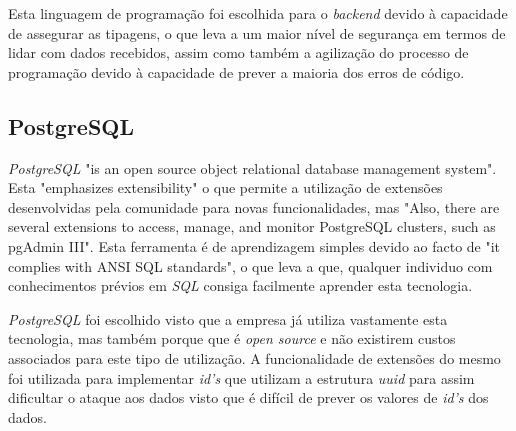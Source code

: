 Esta linguagem de programação foi escolhida para o \textit{backend} devido à capacidade de assegurar as tipagens, o que leva a um maior nível de segurança em termos de lidar com dados recebidos, assim como também a agilização do processo de programação devido à capacidade de prever a maioria dos erros de código.

\subsection{PostgreSQL}
\emph{PostgreSQL} "is an open source object relational database management system"\citep{Juba2015}. Esta "emphasizes extensibility"\citep{Juba2015} o que permite a utilização de extensões desenvolvidas pela comunidade para novas funcionalidades, mas "Also, there are several extensions to access, manage, and monitor PostgreSQL clusters, such as pgAdmin III"\citep{Juba2015}. Esta ferramenta é de aprendizagem simples devido ao facto de "it complies with ANSI SQL standards"\citep{Juba2015}, o que leva a que, qualquer individuo com conhecimentos prévios em \emph{SQL} consiga facilmente aprender esta tecnologia.

\emph{PostgreSQL} foi escolhido visto que a empresa já utiliza vastamente esta tecnologia, mas também porque que é \emph{open source} e não existirem custos associados para este tipo de utilização. A funcionalidade de extensões do mesmo foi utilizada para implementar \emph{id's} que utilizam a estrutura \emph{uuid} para assim dificultar o ataque aos dados visto que é difícil de prever os valores de \emph{id's} dos dados.











